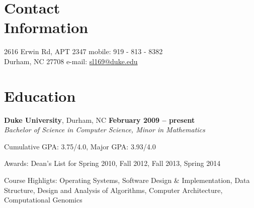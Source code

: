 \documentclass[10pt,margin,line]{resume}
\begin{document}
\begin{resume}

    \section{\mysidestyle Contact\\Information}
    2616 Erwin Rd, APT 2347                   \hfill mobile: 919 - 813 - 8382          			\vspace{0mm}\\\vspace{0mm}%
    Durham, NC 27708          \hfill e-mail: \href{mailto:sl169@duke.edu}{sl169@duke.edu}	\vspace{0mm}\\\vspace{-4.5mm}%

    \section{\mysidestyle Education}
    \textbf{Duke University}, Durham, NC \hfill \textbf{February 2009 -- present}\vspace{0mm}\\\vspace{0mm}%
    \textsl{Bachelor of Science in Computer Science, Minor in Mathematics}
    \vspace{-3mm}\\\vspace{-1mm}%
    \begin{list3}
        \item Cumulative GPA: 3.75/4.0, Major GPA: 3.93/4.0
        \item Awards: Dean's List for Spring 2010, Fall 2012, Fall 2013, Spring 2014
        \item Course Highligts: Operating Systems, Software Design \& Implementation, Data Structure, Design and Analysis of Algorithms, Computer Architecture, Computational Genomics
	\end{list3}


\end{resume}
\end{document}
